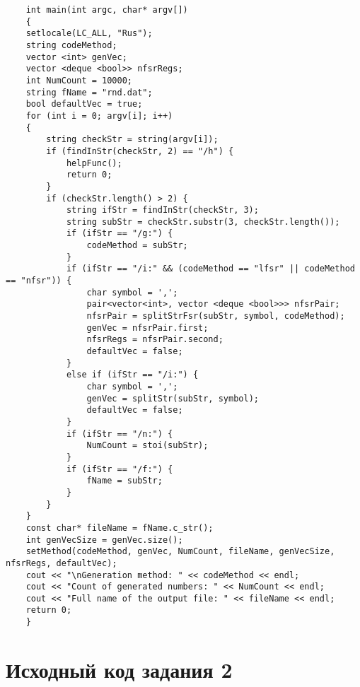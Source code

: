 \documentclass[bachelor, och, coursework]{shiza}
\begin{document}
\begin{verbatim}
	int main(int argc, char* argv[])
	{
	setlocale(LC_ALL, "Rus");
	string codeMethod;
	vector <int> genVec;
	vector <deque <bool>> nfsrRegs;
	int NumCount = 10000;
	string fName = "rnd.dat";
	bool defaultVec = true;
	for (int i = 0; argv[i]; i++)
	{
		string checkStr = string(argv[i]);
		if (findInStr(checkStr, 2) == "/h") {
			helpFunc();
			return 0;
		}
		if (checkStr.length() > 2) {
			string ifStr = findInStr(checkStr, 3);
			string subStr = checkStr.substr(3, checkStr.length());
			if (ifStr == "/g:") {
				codeMethod = subStr;
			}
			if (ifStr == "/i:" && (codeMethod == "lfsr" || codeMethod == "nfsr")) {
				char symbol = ',';
				pair<vector<int>, vector <deque <bool>>> nfsrPair;
				nfsrPair = splitStrFsr(subStr, symbol, codeMethod);
				genVec = nfsrPair.first;
				nfsrRegs = nfsrPair.second;
				defaultVec = false;
			}
			else if (ifStr == "/i:") {
				char symbol = ',';
				genVec = splitStr(subStr, symbol);
				defaultVec = false;
			}
			if (ifStr == "/n:") {
				NumCount = stoi(subStr);
			}
			if (ifStr == "/f:") {
				fName = subStr;
			}
		}
	}
	const char* fileName = fName.c_str();
	int genVecSize = genVec.size();
	setMethod(codeMethod, genVec, NumCount, fileName, genVecSize, nfsrRegs, defaultVec);
	cout << "\nGeneration method: " << codeMethod << endl;
	cout << "Count of generated numbers: " << NumCount << endl;
	cout << "Full name of the output file: " << fileName << endl;
	return 0;
	}
	\end{verbatim}
	
	\section{Исходный код задания 2}
	
\end{document}
